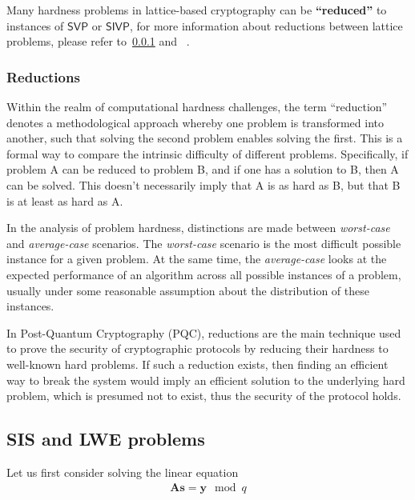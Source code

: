 \documentclass[cryptography,review,submit,pdftex,moreauthors,amsmath,amssymb,aps,strict]{Definitions/mdpi}
\newcommand{\peter}[1]{\textcolor{red}{#1}}
\begin{document}
\noindent Many hardness problems in lattice-based cryptography can be \textbf{``reduced''} to instances of $\mathsf{SVP}$ or $\mathsf{SIVP}$, for more information about reductions between lattice problems, please refer to~\ref{reduction} and ~\cite{reduction_lattice}.


\subsubsection{Reductions}\label{reduction}

Within the realm of computational hardness challenges, the term ``reduction'' denotes a methodological approach whereby one problem is transformed into another, such that solving the second problem enables solving the first. This is a formal way to compare the intrinsic difficulty of different problems.  Specifically, if problem A can be reduced to problem B, and if one has a solution to B, then A can be solved. This doesn't necessarily imply that A is as hard as B, but that B is at least as hard as A. 

In the analysis of problem hardness, distinctions are made between \textit{worst-case} and \textit{average-case} scenarios. The \textit{worst-case} scenario is the most difficult possible instance for a given problem. At the same time, the \textit{average-case} looks at the expected performance of an algorithm across all possible instances of a problem, usually under some reasonable assumption about the distribution of these instances. 

In Post-Quantum Cryptography (PQC), reductions are the main technique used to prove the security of cryptographic protocols by reducing their hardness to well-known hard problems. If such a reduction exists, then finding an efficient way to break the system would imply an efficient solution to the underlying hard problem, which is presumed not to exist, thus the security of the protocol holds.



\subsection{SIS and LWE problems}
Let us first consider solving the linear equation
\begin{align}
    \mathbf{A}\mathbf{s} = \mathbf{y}\mod q \label{eq:linear_equation}
\end{align}
\end{document}
